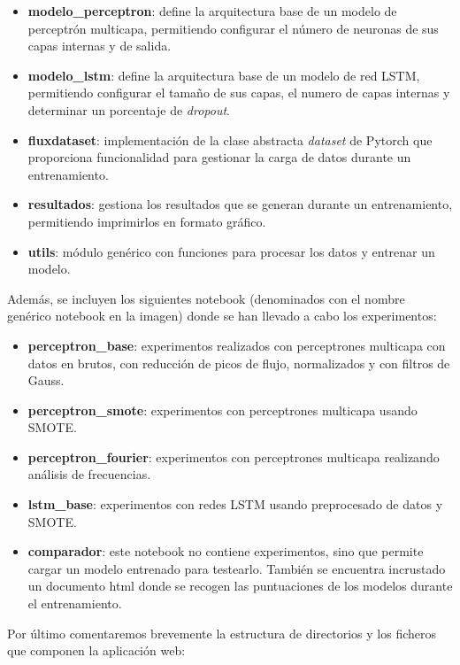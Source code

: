 \begin{itemize}
    \item \textbf{modelo\_perceptron}: define la arquitectura base de un modelo de perceptrón multicapa, permitiendo configurar el número de neuronas de sus capas internas y de salida.
    \item \textbf{modelo\_lstm}: define la arquitectura base de un modelo de red LSTM, permitiendo configurar el tamaño de sus capas, el numero de capas internas y determinar un porcentaje de \textit{dropout}.
    \item \textbf{fluxdataset}: implementación de la clase abstracta \textit{dataset} de Pytorch que proporciona funcionalidad para gestionar la carga de datos durante un entrenamiento.
    \item \textbf{resultados}: gestiona los resultados que se generan durante un entrenamiento, permitiendo imprimirlos en formato gráfico.
    \item \textbf{utils}: módulo genérico con funciones para procesar los datos y entrenar un modelo.
\end{itemize}


Además, se incluyen los siguientes notebook (denominados con el nombre genérico notebook en la imagen) donde se han llevado a cabo los experimentos:

\begin{itemize}
    \item \textbf{perceptron\_base}: experimentos realizados con perceptrones multicapa con datos en brutos, con reducción de picos de flujo, normalizados y con filtros de Gauss.
    \item \textbf{perceptron\_smote}: experimentos con perceptrones multicapa usando SMOTE.
    \item \textbf{perceptron\_fourier}: experimentos con perceptrones multicapa realizando análisis de frecuencias.
    \item \textbf{lstm\_base}: experimentos con redes LSTM usando preprocesado de datos y SMOTE.
    \item \textbf{comparador}: este notebook no contiene experimentos, sino que permite cargar un modelo entrenado para testearlo. También se encuentra incrustado un documento html donde se recogen las puntuaciones de los modelos durante el entrenamiento.
\end{itemize}

Por último comentaremos brevemente la estructura de directorios y los ficheros que componen la aplicación web:

